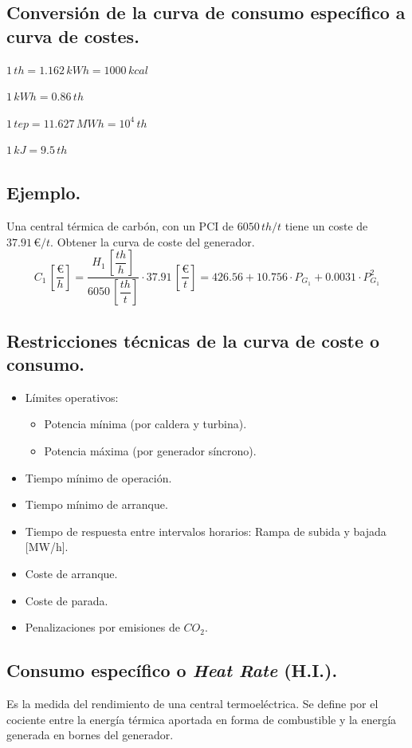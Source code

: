 		\subsection{Conversión de la curva de consumo específico a curva de costes.}
			$1\,th = 1.162\,kWh = 1000\,kcal$
			
			$1\,kWh = 0.86\,th$
			
			$1\,tep = 11.627\,MWh = 10^4\,th$
			
			$1\,kJ = 9.5\,th$
			
		\subsection*{Ejemplo.}
			Una central térmica de carbón, con un PCI de $6050\,th/t$ tiene un coste de $37.91\,\euro/t$. Obtener la curva de coste del generador.
			\[C_1\,\left[\dfrac{\euro}{h}\right] = \dfrac{H_1\,\left[\dfrac{th}{h}\right]}{6050\,\left[\dfrac{th}{t}\right]} \cdot 37.91\,\left[\dfrac{\euro}{t}\right] = 426.56 + 10.756\cdot P_{G_1} + 0.0031\cdot P_{G_1}^2\]
			
		\subsection{Restricciones técnicas de la curva de coste o consumo.}
			\begin{itemize}
				\item Límites operativos:
				\begin{itemize}
					\item Potencia mínima (por caldera y turbina).
					\item Potencia máxima (por generador síncrono).
				\end{itemize}
				
				\item Tiempo mínimo de operación.
				\item Tiempo mínimo de arranque.
				\item Tiempo de respuesta entre intervalos horarios: Rampa de subida y bajada [MW/h].
				\item Coste de arranque.
				\item Coste de parada.
				\item Penalizaciones por emisiones de $CO_2$.
			\end{itemize}
			
		\subsection{Consumo específico o \textit{Heat Rate} (H.I.).}
			Es la medida del rendimiento de una central termoeléctrica. Se define por el cociente entre la energía térmica aportada en forma de combustible y la energía generada en bornes del generador.
			
